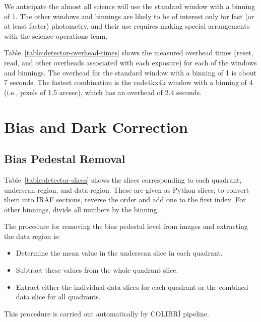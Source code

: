 We anticipate the almost all science will use the standard  window with a binning of 1. The other windows and binnings are likely to be of interest only for fast (or at least faster) photometry, and their use requires making special arrangements with the science operations team.

Table~\ref{table:detector-overhead-times} shows the measured overhead times (reset, read, and other overheads associated with each exposure) for each of the windows and binnings. The overhead for the standard  window with a binning of 1 is about 7 seconds. The fastest combination is the code{4kx4k} window with a binning of 4 (i.e., pixels of 1.5 arcsec), which has an overhead of 2.4 seconds.

\section{Bias and Dark Correction}

\subsection{Bias Pedestal Removal}

Table~\ref{table:detector-slices} shows the slices corresponding to each quadrant, underscan region, and data region. These are given as Python slices; to convert them into IRAF sections, reverse the order and add one to the first index. For other binnings, divide all numbers by the binning.

The procedure for removing the bias pedestal level from  images and extracting the data region is:
\begin{itemize}
\item Determine the mean value in the underscan slice in each quadrant.
\item Subtract these values from the whole quadrant slice.
\item Extract either the individual data slices for each quadrant or the combined data slice for all quadrants.
\end{itemize}

This procedure is carried out automatically by COLIBRÍ pipeline.

